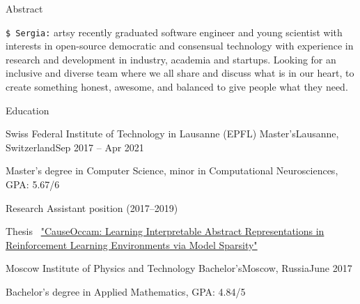 \documentclass{resume} %
\newcommand*{\img}[1]{%
	\raisebox{-.02\baselineskip}{%
		\texttt{[image: \#1]}%
	}%
}
\newcommand*{\emoji}[1]{\img{./emoji/\imgpref#1.png}}
\newcommand*{\mybold}[1]{{\color{pinkunderline} #1}}
\newcommand*{\logo}[1]{%
	\raisebox{-.02\baselineskip}{%
		\texttt{[image: ./img/\\imgpref\#1]}%
	}%
}
\def\imgpref{bleak-}
\newcommand{\mylink}{{\color{gray}\faExternalLink}}
\begin{document}
	\pagestyle{fancy}
	 \renewcommand{\familydefault}{\sfdefault}
	 \sffamily
	
\newcommand{\myitem}{\item[\textcolor{pinkitem}{\Huge\raisebox{-2pt}{$\cdot$}}]}

\begin{rSection}{Abstract}

{{\color{pinkitem} \texttt{\$ Sergia:}} artsy recently graduated software engineer and young scientist with interests in open-source democratic and consensual technology with experience in research and development in industry, academia and startups. Looking for an inclusive and diverse team where we all share and discuss what is in our heart, to create something honest, awesome, and balanced to give people what they need.}

\end{rSection}

\begin{rSection}{Education}
\hspace{-1em}

\begin{rSubsection}{\logo{Logo_EPFL.pdf} Swiss Federal Institute of Technology in Lausanne (EPFL) \emoji{flag-ch}}{Master's}{Lausanne, Switzerland}{Sep 2017 -- Apr 2021}
\myitem Master's degree in \mybold{Computer Science,} minor in Computational \mybold{Neurosciences}, GPA: \mybold{5.67}/6
\myitem Research Assistant position (2017--2019)
\myitem Thesis \mylink~\href{https://sergia-ch.github.io/causality-simplicity/CauseOccam_Learning_Interpretable_Abstract_Representations_in_Reinforcement_Learning_Environments_via_Model_Sparsity.pdf}{"CauseOccam: Learning Interpretable Abstract Representations in
Reinforcement Learning Environments via Model Sparsity"}
\end{rSubsection}
\begin{rSubsection}{\logo{mipt.png} Moscow Institute of Physics and Technology \emoji{flag-ru}}{Bachelor's}{Moscow, Russia}{June 2017}
\item[] Bachelor's degree in \mybold{Applied Mathematics,} GPA: \mybold{4.84}/5
\end{rSubsection}
\end{rSection}
\end{document}
